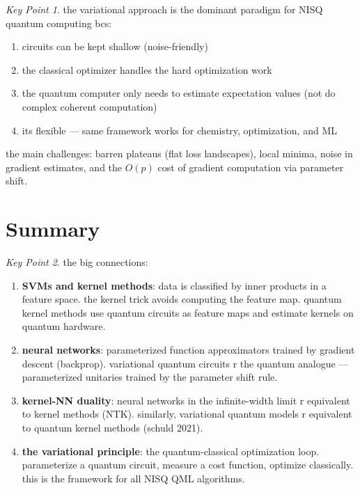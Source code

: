 \documentclass[11pt,a4paper]{article}
\theoremstyle{definition}
\theoremstyle{remark}
\newtheorem*{keypoint}{Key Point}
\begin{document}
\begin{keypoint}
the variational approach is the dominant paradigm for NISQ quantum computing bcs:
\begin{enumerate}
    \item circuits can be kept shallow (noise-friendly)
    \item the classical optimizer handles the hard optimization work
    \item the quantum computer only needs to estimate expectation values (not do complex coherent computation)
    \item its flexible --- same framework works for chemistry, optimization, and ML
\end{enumerate}
the main challenges: barren plateaus (flat loss landscapes), local minima, noise in gradient estimates, and the $O(p)$ cost of gradient computation via parameter shift.
\end{keypoint}

\section{Summary}

\begin{keypoint}
the big connections:
\begin{enumerate}
    \item \textbf{SVMs and kernel methods}: data is classified by inner products in a feature space. the kernel trick avoids computing the feature map. quantum kernel methods use quantum circuits as feature maps and estimate kernels on quantum hardware.
    \item \textbf{neural networks}: parameterized function approximators trained by gradient descent (backprop). variational quantum circuits r the quantum analogue --- parameterized unitaries trained by the parameter shift rule.
    \item \textbf{kernel-NN duality}: neural networks in the infinite-width limit r equivalent to kernel methods (NTK). similarly, variational quantum models r equivalent to quantum kernel methods (schuld 2021).
    \item \textbf{the variational principle}: the quantum-classical optimization loop. parameterize a quantum circuit, measure a cost function, optimize classically. this is the framework for all NISQ QML algorithms.
\end{enumerate}
\end{keypoint}
\end{document}
